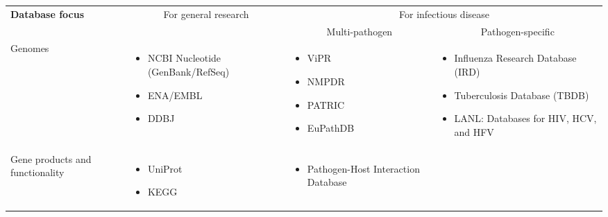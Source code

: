 \centering
\small
\begin{tabular}{p{3.5cm} l l l}
  \toprule
  \textbf{Database focus} & \multicolumn{1}{c}{For general research} & \multicolumn{2}{c}{For infectious disease}\\
  \cline{3-4}
  & & \multicolumn{1}{c}{Multi-pathogen} & \multicolumn{1}{c}{Pathogen-specific} \\
  \midrule
  Genomes &
  \begin{minipage}[t]{3.5cm}
    \raggedright
    \begin{itemize}[noitemsep]
    \item NCBI Nucleotide (GenBank/RefSeq)
    \item ENA/EMBL
    \item DDBJ
    \end{itemize}
  \end{minipage} & 
  \begin{minipage}[t]{3.5cm}
    \raggedright
    \begin{itemize}[noitemsep]
    \item ViPR
    \item NMPDR
    \item PATRIC
    \item EuPathDB
    \end{itemize}
  \end{minipage} & 
  \begin{minipage}[t]{3.5cm}
    \raggedright
    \begin{itemize}[noitemsep]
    \item Influenza Research Database (IRD)
    \item Tuberculosis Database (TBDB)
    \item LANL: Databases for HIV, HCV, and HFV 
    \end{itemize}
  \end{minipage}
  \\
  Gene products and functionality &
  \begin{minipage}[t]{3.5cm}
    \raggedright
    \begin{itemize}[noitemsep]
    \item UniProt
    \item KEGG
    \end{itemize}
  \end{minipage} &
  \begin{minipage}[t]{3.5cm}
    \raggedright
    \begin{itemize}[noitemsep]
    \item Pathogen-Host Interaction Database 

\end{itemize}
\end{minipage}
\end{tabular}
